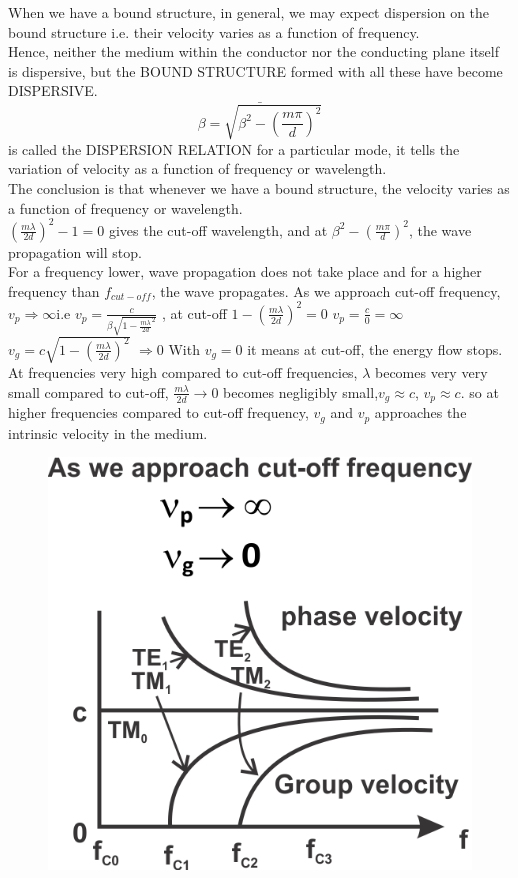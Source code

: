 When we have a bound structure, in general, we may expect dispersion on the bound structure i.e. their velocity varies as a function of frequency.\\
Hence, neither the medium within the conductor nor the conducting plane itself is dispersive, but the BOUND STRUCTURE formed with all these have become DISPERSIVE.
\begin{equation}
\bar{\beta = \sqrt{\beta^{2} -(\frac{m\pi}{d})^{2}}}
\end{equation} is called the DISPERSION RELATION for a particular mode, it tells the variation of velocity as a function of frequency or wavelength.\\ The conclusion is that whenever we have a bound structure, the velocity varies as a function of frequency or wavelength.\\
$(\frac{m\lambda}{2d})^{2} -1=0$ gives the cut-off wavelength, and at $\beta^{2} -(\frac{m\pi}{d})^{2}$, the wave propagation will stop.\\
For a frequency lower, wave propagation does not take place and for a higher frequency than $f_{cut-off}$, the wave propagates.
As we approach cut-off frequency, $v_{p}\Rightarrow \infty$i.e $v_{p}= \frac{c}{\beta \sqrt{1- \frac{m \lambda}{2d}^{2}}}$ , at cut-off $1 - (\frac{m\lambda}{2d})^{2}=0$ $v_{p} =\frac{c}{0} =\infty$\\
$v_{g} =c \sqrt{1-(\frac{m\lambda}{2d})^{2}}$ $\Rightarrow 0$
With $v_{g} = 0$ it means at cut-off, the energy flow stops. At frequencies very high compared to cut-off frequencies, $\lambda$ becomes very very small compared to cut-off, $\frac{m\lambda}{2d} \rightarrow 0$ becomes negligibly small,$v_{g} \approx c$, $v_{p} \approx c$. so at higher frequencies compared to cut-off frequency, $v_{g}$ and $v_{p}$ approaches the intrinsic velocity in the medium.\\
\begin{figure}[h]
\centering
\includegraphics[scale=1]{./graphics/silas5}
\caption{}
\end{figure}
